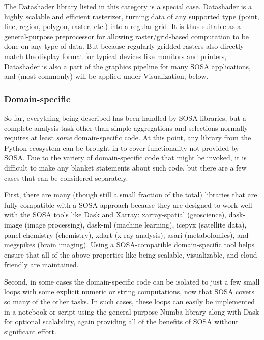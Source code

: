 The Datashader library listed in this category is a special case. Datashader is a highly scalable and efficient rasterizer, turning data of any supported type (point, line, region, polygon, raster, etc.) into a regular grid. It is thus suitable as a general-purpose preprocessor for allowing raster/grid-based computation to be done on any type of data. But because regularly gridded rasters also directly match the display format for typical devices like monitors and printers, Datashader is also a part of the graphics pipeline for many SOSA applications, and (most commonly) will be applied under Visualization, below.


\subsubsection{Domain-specific}

So far, everything being described has been handled by SOSA libraries, but a complete analysis task other than simple aggregations and selections normally requires at least \emph{some} domain-specific code. At this point, any library from the Python ecosystem can be brought in to cover functionality not provided by SOSA. Due to the variety of domain-specific code that might be invoked, it is difficult to make any blanket statements about such code, but there are a few cases that can be considered separately.

First, there are many (though still a small fraction of the total) libraries that are fully compatible with a SOSA approach because they are designed to work well with the SOSA tools like Dask and Xarray: xarray-spatial (geoscience), dask-image (image processing), dask-ml (machine learning), icepyx (satellite data), panel-chemistry (chemistry), xdart (x-ray analysis), asari (metabolomics), and megspikes (brain imaging). Using a SOSA-compatible domain-specific tool helps ensure that all of the above properties like being scalable, visualizable, and cloud-friendly are maintained.

Second, in some cases the domain-specific code can be isolated to just a few small loops with some explicit numeric or string computations, now that SOSA covers so many of the other tasks. In such cases, these loops can easily be implemented in a notebook or script using the general-purpose Numba library along with Dask for optional scalability, again providing all of the benefits of SOSA without significant effort.

